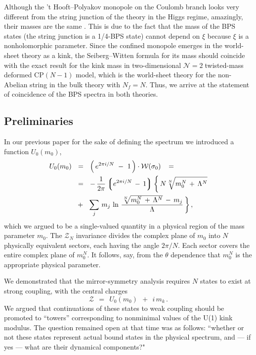 \documentclass[epsfig,12pt]{article}
\def\beq{\begin{equation}}
\def\eeq{\end{equation}}
\newcommand{\ntwo}{${\mathcal N}=2\;$}
\def\beq{\begin{equation}}
\def\eeq{\end{equation}}
\newcommand{\mc}[1]{\mathcal{#1}}
\newcommand{\lgr}{\left\lgroup}
\newcommand{\rgr}{\right\rgroup}
\begin{document}
	Although the 't Hooft--Polyakov monopole on the Coulomb branch
	looks very different from the string junction of the theory in the Higgs regime,
	amazingly, their masses are the same 
	\cite{Shifman:2004dr,4}. 
	This is due to the fact that the mass of the BPS states (the string junction is a 1/4-BPS state) cannot depend on
	$\xi$ because $\xi$ is a nonholomorphic parameter. 
	Since the confined monopole emerges in the world-sheet theory as a kink, the Seiberg--Witten
	formula for its mass should coincide with the exact result for the kink
	mass in two-dimensional \ntwo twisted-mass deformed  CP$(N-1)$ model, which is 
	the world-sheet theory for the non-Abelian string in the bulk theory with $N_f=N$. 
	Thus, we arrive at the statement of coincidence of the BPS spectra in both theories.




\subsection{Preliminaries}
\label{prer}

	In our previous paper \cite{Bolokhov:2011mp} for the sake of defining the spectrum we introduced a function $ U_0(m_0) $,
\begin{align}
%
	U_0 (m_0) & ~~=~~ \left(\, e^{2 \pi i / N} ~-~ 1 \,\right) \cdot \mc{W}(\sigma_0)\,
	~~=~~
\nonumber
	\\
%
	&
	~~=~~ -\, \frac{1}{2\pi} \lgr e^{2\pi i / N} \,-\, 1 \rgr \biggl\{\, N \sqrt[N] { m_0^N \,+\, \Lambda^N }  
%
	\\
\nonumber
	&
	~~+~~  \sum_j\, m_j\, \ln \, \frac{ \sqrt[N] { m_0^N \,+\, \Lambda^N } \,-\, m_j } { \Lambda} \,\biggr\}\,,
\end{align}
	which we argued to be a single-valued quantity in a physical region of the mass parameter $ m_0 $.
	The $\mc{Z}_N$ invariance divides the complex plane of $ m_0 $ into $ N $ physically equivalent  sectors,
	each having the angle $2\pi/N$. Each sector covers the entire complex plane of
	$m_0^N$. 
	It follows, say, from the $\theta$ dependence that $m_0^N$ is the appropriate physical parameter.
	
	We demonstrated that the mirror-symmetry analysis requires $ N $ states to exist at strong coupling,
	with  the 
	central charges
\beq
\label{Usp}
	\mc{Z}  ~~=~~  U_0(m_0)  ~~+~~  i\,m_k\,.
\eeq
	We argued that continuations of these states to  weak coupling should be promoted to ``towers''
	corresponding to nonminimal values of the U(1) kink modulus.
	The question remained open at that time was as follows: ``whether or not these states represent
	actual bound states in the physical spectrum, and --- if yes --- what are their dynamical components?"
\end{document}
